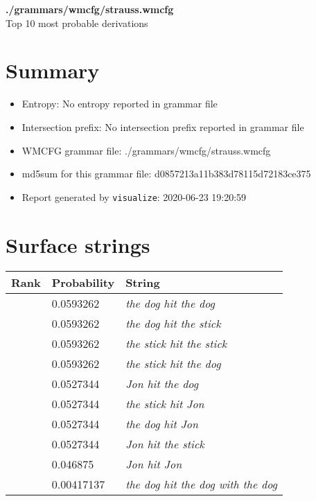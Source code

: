 \documentclass[11pt]{article}
\begin{document}
\begin{center}
{\huge \textbf{./grammars/wmcfg/strauss.wmcfg}} \\[0.5em]
{\normalsize Top 10 most probable derivations}
\end{center}

\section{Summary}
\begin{itemize}
	\item Entropy: No entropy reported in grammar file
	\item Intersection prefix: No intersection prefix reported in grammar file
	\item WMCFG grammar file: ./grammars/wmcfg/strauss.wmcfg
	\item md5sum for this grammar file: d0857213a11b383d78115d72183ce375
	\item Report generated by \texttt{visualize}: 2020-06-23 19:20:59
\end{itemize}

\section{Surface strings}
\hspace{1em}
\renewcommand{\arraystretch}{1.15}
\newcommand\rownumber{\stepcounter{rownumber}\arabic{rownumber}}
\begin{tabular}{l l l}
	\hline
	 Rank & Probability & String \\
	\hline
\rownumber & 0.0593262 & \textit{the dog hit the dog} \\
\rownumber & 0.0593262 & \textit{the dog hit the stick} \\
\rownumber & 0.0593262 & \textit{the stick hit the stick} \\
\rownumber & 0.0593262 & \textit{the stick hit the dog} \\
\rownumber & 0.0527344 & \textit{Jon hit the dog} \\
\rownumber & 0.0527344 & \textit{the stick hit Jon} \\
\rownumber & 0.0527344 & \textit{the dog hit Jon} \\
\rownumber & 0.0527344 & \textit{Jon hit the stick} \\
\rownumber & 0.046875 & \textit{Jon hit Jon} \\
\rownumber & 0.00417137 & \textit{the dog hit the dog with the dog} \\
	\hline
\end{tabular}
\pagebreak
\end{document}
